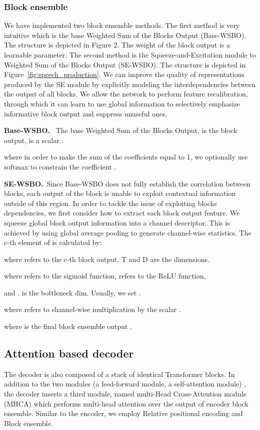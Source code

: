 \documentclass[a4paper]{article}
\begin{document}
\subsubsection{Block ensemble}
We have implemented two block ensemble methods. The first method is very intuitive which is the base Weighted Sum of the Blocks Output (Base-WSBO). The structure is depicted in Figure 2. The weight of the block output is a learnable parameter. The second method is the Squeeze-and-Excitation module \cite{Hu2020SqueezeandExcitationN} to Weighted Sum of the Blocks Output (SE-WSBO). The structure is depicted in Figure~\ref{fig:speech_production}. We can improve the quality of representations produced by the SE module\cite{Hu2020SqueezeandExcitationN} by explicitly modeling the interdependencies between the output of all blocks. We allow the network to perform feature recalibration, through which it can learn to use global information to selectively emphasize informative block output and suppress unuseful ones.



\noindent\textbf{Base-WSBO.} \ The base Weighted Sum of the Blocks Output,  is the block output,  is a scalar .


where in order to make the sum of the coefficients equal to 1, we optionally use softmax to constrain the coefficient .


\noindent\textbf{SE-WSBO.}\ Since Base-WSBO does not fully establish the correlation between blocks, each output  of the
block is unable to exploit contextual information outside of this region. In order to tackle the issue of exploiting blocks dependencies, we first consider how to extract each block output feature. We squeeze global block output information into a channel descriptor. This is achieved by using global average pooling to generate channel-wise statistics. The c-th element of  is calculated by:

where  refers to the c-th block output, T and D are the dimensions.

where  refers to the sigmoid function,  refers to the ReLU \cite{Nair2010RectifiedLU} function,

and
.  is the bottleneck dim. Usually, we set .

where  refers to
channel-wise multiplication by the scalar .

where  is the final block ensemble output .

\subsection{ Attention based decoder}
The decoder is also composed of a stack of identical Transformer blocks. In addition to the two modules (a feed-forward module, a self-attention module) , the decoder inserts a third module, named multi-Head Cross-Attention module (MHCA) which performs multi-head attention over the output of encoder block ensemble. Similar to the encoder, we employ Relative positional encoding and Block ensemble.
\end{document}
